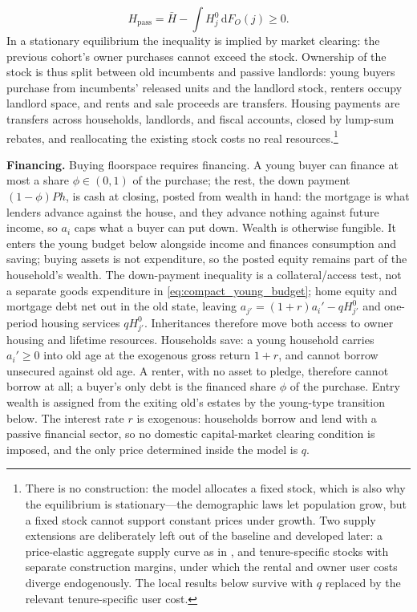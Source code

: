 \documentclass[11pt]{article}
\newcommand{\dd}{\mathrm d}
\newcommand{\1}{\mathbf 1}
\begin{document}
\[
H_{\mathrm{pass}}
=
\bar H-\int H_j^0\,\dd F_O(j)\ge0.
\]
In a stationary equilibrium the inequality is implied by market clearing: the previous cohort's owner purchases cannot exceed the stock. Ownership of the stock is thus split between old incumbents and passive landlords: young buyers purchase from incumbents' released units and the landlord stock, renters occupy landlord space, and rents and sale proceeds are transfers. Housing payments are transfers across households, landlords, and fiscal accounts, closed by lump-sum rebates, and reallocating the existing stock costs no real resources.\footnote{There is no construction: the model allocates a fixed stock, which is also why the equilibrium is stationary---the demographic laws let population grow, but a fixed stock cannot support constant prices under growth. Two supply extensions are deliberately left out of the baseline and developed later: a price-elastic aggregate supply curve as in \citet{coven2024}, and tenure-specific stocks with separate construction margins, under which the rental and owner user costs diverge endogenously. The local results below survive with $q$ replaced by the relevant tenure-specific user cost.}

\textbf{Financing.} Buying floorspace requires financing. A young buyer can finance at most a share $\phi\in(0,1)$ of the purchase; the rest, the down payment $(1-\phi)Ph$, is cash at closing, posted from wealth in hand: the mortgage is what lenders advance against the house, and they advance nothing against future income, so $a_i$ caps what a buyer can put down. Wealth is otherwise fungible. It enters the young budget below alongside income and finances consumption and saving; buying assets is not expenditure, so the posted equity remains part of the household's wealth. The down-payment inequality is a collateral/access test, not a separate goods expenditure in \eqref{eq:compact_young_budget}; home equity and mortgage debt net out in the old state, leaving $a_{j'}=(1+r)a_i'-qH_{j'}^0$ and one-period housing services $qH_{j'}^0$. Inheritances therefore move both access to owner housing and lifetime resources. Households save: a young household carries $a_i'\ge0$ into old age at the exogenous gross return $1+r$, and cannot borrow unsecured against old age. A renter, with no asset to pledge, therefore cannot borrow at all; a buyer's only debt is the financed share $\phi$ of the purchase. Entry wealth is assigned from the exiting old's estates by the young-type transition below. The interest rate $r$ is exogenous: households borrow and lend with a passive financial sector, so no domestic capital-market clearing condition is imposed, and the only price determined inside the model is $q$.
\end{document}
